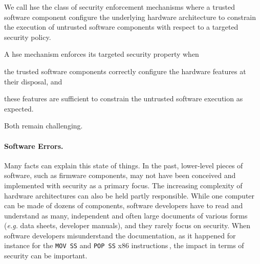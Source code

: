 \begin{definition}
  We call \ac{hse} the class of security enforcement mechanisms where a trusted
  software component configure the underlying hardware architecture to constrain
  the execution of untrusted software components with respect to a targeted
  security policy.
\end{definition}

A \ac{hse} mechanism enforces its targeted security property when
%
\begin{inparaenum}[(1)]
\item the trusted software components correctly configure the hardware features
  at their disposal, and
%
\item these features are sufficient to constrain the untrusted software
  execution as expected.
\end{inparaenum}
%
Both remain challenging.

\paragraph{Software Errors.}
%

Many facts can explain this state of things.
%
In the past, lower-level pieces of software, such as firmware components, may
not have been conceived and implemented with security as a primary focus.
%
The increasing complexity of hardware architectures can also be held partly
responsible.
%
While one computer can be made of dozens of components, software developers have
to read and understand as many, independent and often large documents of various
forms (\emph{e.g.} data sheets, developer manuals), and they rarely focus on
security.
%
When software developers misunderstand the documentation, as it happened for
instance for the \texttt{MOV SS} and \texttt{POP SS} x86
instructions\,\cite{movsspopss}, the impact in terms of security can be
important.

